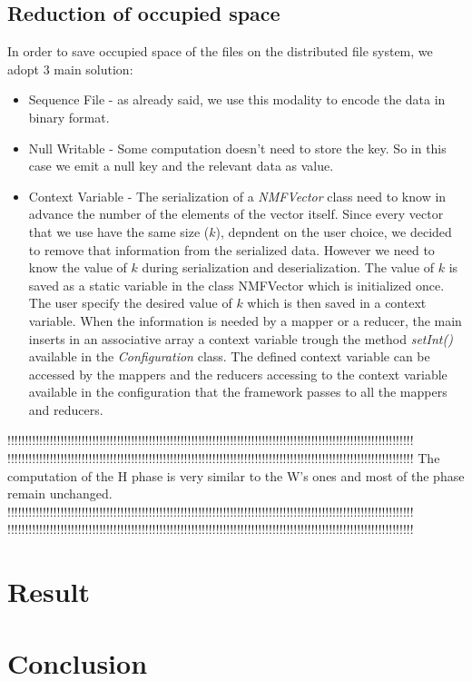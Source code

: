 \documentclass[a4paper,12pt]{article}
\newcommand{\METHOD}[1] {\textit{#1}}
\newcommand{\CLASS}[1] {\textit{#1}}
\begin{document}
\subsection{Reduction of occupied space}

In order to save occupied space of the files on the distributed file system, we adopt 3 main solution:
\begin{itemize}

  \item Sequence File - as already said, we use this modality to encode the data in binary format. 
  
  \item Null Writable - Some computation doesn't need to store the key. So in this case we emit a null key and the relevant data as value.
  
  \item Context Variable - The serialization of a \CLASS{NMFVector} class need to know in advance the number of the elements of the vector itself. Since every vector that we use have the same size ($k$), depndent on the user choice, we decided to remove that information from the serialized data. However we need to know the value of $k$ during serialization and deserialization. The value of $k$ is saved as a static variable in the class NMFVector which is initialized once. The user specify the desired value of $k$ which is then saved in a context variable. When the information is needed by a mapper or a reducer, the main inserts in an associative array a context variable trough the method \METHOD{setInt()} available in the \CLASS{Configuration} class. The defined context variable can be accessed by the mappers and the reducers accessing to the context variable available in the configuration that the framework passes to all the mappers and reducers.

\end{itemize}








!!!!!!!!!!!!!!!!!!!!!!!!!!!!!!!!!!!!!!!!!!!!!!!!!!!!!!!!!!!!!!!!!!!!!!!!!!!!!!!!!!!!!!!!!!!!!!!!!!!!!!!!!!!!!!!!!!!
!!!!!!!!!!!!!!!!!!!!!!!!!!!!!!!!!!!!!!!!!!!!!!!!!!!!!!!!!!!!!!!!!!!!!!!!!!!!!!!!!!!!!!!!!!!!!!!!!!!!!!!!!!!!!!!!!!!
The computation of the H phase is very similar to the W's ones and
most of the phase remain unchanged.
!!!!!!!!!!!!!!!!!!!!!!!!!!!!!!!!!!!!!!!!!!!!!!!!!!!!!!!!!!!!!!!!!!!!!!!!!!!!!!!!!!!!!!!!!!!!!!!!!!!!!!!!!!!!!!!!!!!
!!!!!!!!!!!!!!!!!!!!!!!!!!!!!!!!!!!!!!!!!!!!!!!!!!!!!!!!!!!!!!!!!!!!!!!!!!!!!!!!!!!!!!!!!!!!!!!!!!!!!!!!!!!!!!!!!!!

\section{Result}
\label{result}

\section{Conclusion}
\label{conclusion}


\nocite{*}




\end{document}
